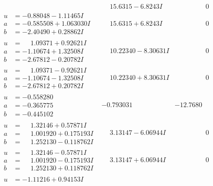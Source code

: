 \documentclass[1p]{elsarticle_modified}
\theoremstyle{definition}
\begin{document}
$$\begin{array}{c|c|c}
 & \phantom{-}15.6315 - 6.8243 I & \phantom{-0.000000 } 0 \\ \hline\begin{aligned}
u &= -0.88048 - 1.11465 I \\
a &= -0.585508 + 1.063030 I \\
b &= -2.40490 + 0.28862 I\end{aligned}
 & \phantom{-}15.6315 + 6.8243 I & \phantom{-0.000000 } 0 \\ \hline\begin{aligned}
u &= \phantom{-}1.09371 + 0.92621 I \\
a &= -1.10674 + 1.32508 I \\
b &= -2.67812 - 0.20782 I\end{aligned}
 & \phantom{-}10.22340 - 8.30631 I & \phantom{-0.000000 } 0 \\ \hline\begin{aligned}
u &= \phantom{-}1.09371 - 0.92621 I \\
a &= -1.10674 - 1.32508 I \\
b &= -2.67812 + 0.20782 I\end{aligned}
 & \phantom{-}10.22340 + 8.30631 I & \phantom{-0.000000 } 0 \\ \hline\begin{aligned}
u &= -0.558280\phantom{ +0.000000I} \\
a &= -0.365775\phantom{ +0.000000I} \\
b &= -0.445102\phantom{ +0.000000I}\end{aligned}
 & -0.793031\phantom{ +0.000000I} & -12.7680\phantom{ +0.000000I} \\ \hline\begin{aligned}
u &= \phantom{-}1.32146 + 0.57871 I \\
a &= \phantom{-}1.001920 + 0.175193 I \\
b &= \phantom{-}1.252130 - 0.118762 I\end{aligned}
 & \phantom{-}3.13147 - 6.06944 I & \phantom{-0.000000 } 0 \\ \hline\begin{aligned}
u &= \phantom{-}1.32146 - 0.57871 I \\
a &= \phantom{-}1.001920 - 0.175193 I \\
b &= \phantom{-}1.252130 + 0.118762 I\end{aligned}
 & \phantom{-}3.13147 + 6.06944 I & \phantom{-0.000000 } 0 \\ \hline\begin{aligned}
u &= -1.11216 + 0.94153 I \\

\end{aligned}
\end{array}$$
\end{document}
